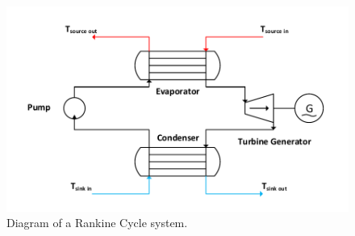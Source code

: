 \begin{figure}[h]
	\centering

	\includegraphics[width=\textwidth]{figures/RankineCycleDiagram.pdf}

	\caption{Diagram of a Rankine Cycle system.}
	\label{fig:rankine_cycle_diagram}
	
\end{figure}